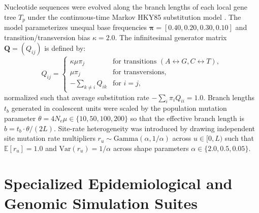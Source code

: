 Nucleotide sequences were evolved along the branch lengths of each local gene tree $T_p$ under the continuous-time Markov HKY85 substitution model \citep{hasegawa1985dating}.
The model parameterizes unequal base frequencies $\bm{\pi} = [0.40, 0.20, 0.30, 0.10]$ and transition/transversion bias $\kappa = 2.0$.
The infinitesimal generator matrix $\mathbf{Q} = (Q_{ij})$ is defined by:
\begin{equation}
Q_{ij} = \begin{cases}
\kappa \mu \pi_j & \text{for transitions } (A \leftrightarrow G, C \leftrightarrow T), \\
\mu \pi_j & \text{for transversions}, \\
-\sum_{k \ne i} Q_{ik} & \text{for } i = j,
\end{cases}
\end{equation}
normalized such that average substitution rate $-\sum_i \pi_i Q_{ii} = 1.0$.
Branch lengths $t_b$ generated in coalescent units were scaled by the population mutation parameter $\theta = 4 N_e\mu \in \{10, 50, 100, 200\}$ so that the effective branch length is $b = t_b \cdot \theta / (2L)$.
Site-rate heterogeneity was introduced by drawing independent site mutation rate multipliers $r_u \sim \text{Gamma}(\alpha, 1/\alpha)$ across $u \in [0, L)$ such that $\mathbb{E}[r_u] = 1.0$ and $\text{Var}(r_u) = 1/\alpha$ across shape parameters $\alpha \in \{2.0, 0.5, 0.05\}$.

\section{Specialized Epidemiological and Genomic Simulation Suites}
\label{supp:specialized_sims_full}

